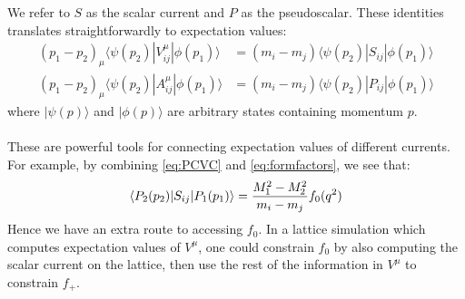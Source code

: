 We refer to $S$ as the scalar current and $P$ as the pseudoscalar. These identities translates straightforwardly to expectation values:
\begin{align}
	\label{eq:PCVC}
	(p_1 - p_2)_{\mu} \langle \psi(p_2) | V^{\mu}_{ij} | \phi(p_1) \rangle &= (m_i - m_j) \langle \psi(p_2) | S_{ij} | \phi(p_1) \rangle \\
	(p_1 - p_2)_{\mu} \langle \psi(p_2) | A^{\mu}_{ij} | \phi(p_1) \rangle &= (m_i - m_j) \langle \psi(p_2) | P_{ij} | \phi(p_1) \rangle
\end{align}
where $| \psi(p) \rangle$ and $| \phi(p) \rangle$ are arbitrary states containing momentum $p$.
\\ \\
These are powerful tools for connecting expectation values of different currents. For example, by combining \eqref{eq:PCVC} and \eqref{eq:formfactors}, we see that:
\begin{align}
	\langle P_2(p_2) | S_{ij} | P_1(p_1) \rangle = {M_1^2 - M_2^2 \over m_i - m_j} f_0(q^2)
\end{align}
Hence we have an extra route to accessing $f_0$. In a lattice simulation which computes expectation values of $V^{\mu}$, one could constrain $f_0$ by also computing the scalar current on the lattice, then use the rest of the information in $V^{\mu}$ to constrain $f_+$.
